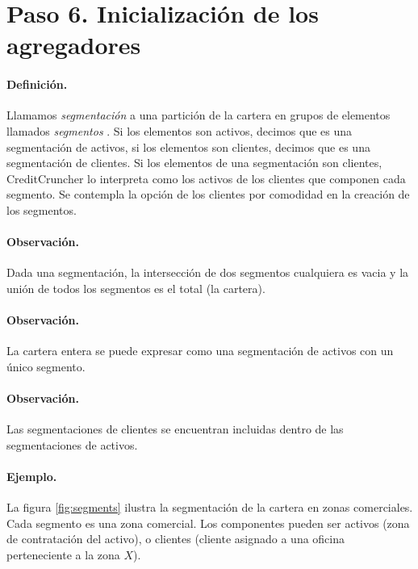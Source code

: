 
\section{Paso 6. Inicializaci\'on de los agregadores}

\paragraph{Definici\'on.} Llamamos \emph{segmentaci\'on}
a una partici\'on de la cartera en grupos de elementos llamados \emph{segmentos}
. Si los elementos son activos, decimos que es una segmentaci\'on
de activos, si los elementos son clientes, decimos que es una segmentaci\'on de
clientes. Si los elementos de una segmentaci\'on son clientes, CreditCruncher lo
interpreta como los activos de los clientes que componen cada segmento. Se contempla
la opci\'on de los clientes por comodidad en la creaci\'on de los segmentos.

\paragraph{Observaci\'on.} Dada una segmentaci\'on, la intersecci\'on
de dos segmentos cualquiera es vacia y la uni\'on de todos los
segmentos es el total (la cartera).

\paragraph{Observaci\'on.} La cartera entera se puede expresar como una
segmentaci\'on de activos con un \'unico segmento.

\paragraph{Observaci\'on.} Las segmentaciones de clientes se encuentran
incluidas dentro de las segmentaciones de activos.

\paragraph{Ejemplo.} La figura \ref{fig:segments} ilustra la segmentaci\'on
de la cartera en zonas comerciales. Cada segmento es una zona comercial.
Los componentes pueden ser activos (zona de contrataci\'on del activo), o
clientes (cliente asignado a una oficina perteneciente a la zona $X$).

